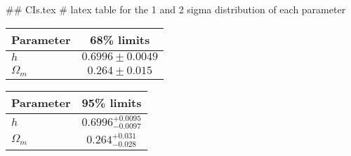 ## CIs.tex
# latex table for the 1 and 2 sigma distribution of each parameter

\begin{tabular} { l  c}
 Parameter &  68\% limits\\
\hline
{\boldmath$h              $} & $0.6996\pm 0.0049          $\\
{\boldmath$\Omega_m       $} & $0.264\pm 0.015            $\\
\hline
\end{tabular}

\begin{tabular} { l  c}
 Parameter &  95\% limits\\
\hline
{\boldmath$h              $} & $0.6996^{+0.0095}_{-0.0097}$\\
{\boldmath$\Omega_m       $} & $0.264^{+0.031}_{-0.028}   $\\
\hline
\end{tabular}
